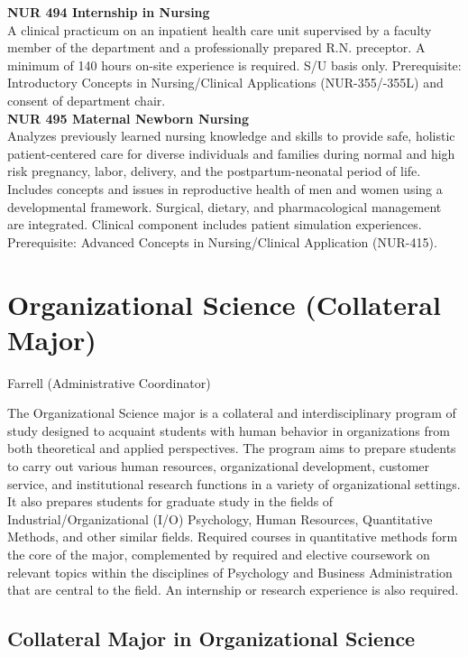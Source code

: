 \documentclass[
  letterpaper,
]{scrbook}
\begin{document}
\textbf{NUR 494 Internship in Nursing}\\
A clinical practicum on an inpatient health care unit supervised by a
faculty member of the department and a professionally prepared R.N.
preceptor. A minimum of 140 hours on-site experience is required. S/U
basis only. Prerequisite: Introductory Concepts in Nursing/Clinical
Applications (NUR-355/-355L) and consent of department chair.\\
\textbf{NUR 495 Maternal Newborn Nursing}\\
Analyzes previously learned nursing knowledge and skills to provide
safe, holistic patient-centered care for diverse individuals and
families during normal and high risk pregnancy, labor, delivery, and the
postpartum-neonatal period of life. Includes concepts and issues in
reproductive health of men and women using a developmental framework.
Surgical, dietary, and pharmacological management are integrated.
Clinical component includes patient simulation experiences.
Prerequisite: Advanced Concepts in Nursing/Clinical Application
(NUR-415).

\section{Organizational Science (Collateral
Major)}\label{sec-organizational-science}

Farrell (Administrative Coordinator)

The Organizational Science major is a collateral and interdisciplinary
program of study designed to acquaint students with human behavior in
organizations from both theoretical and applied perspectives. The
program aims to prepare students to carry out various human resources,
organizational development, customer service, and institutional research
functions in a variety of organizational settings. It also prepares
students for graduate study in the fields of Industrial/Organizational
(I/O) Psychology, Human Resources, Quantitative Methods, and other
similar fields. Required courses in quantitative methods form the core
of the major, complemented by required and elective coursework on
relevant topics within the disciplines of Psychology and Business
Administration that are central to the field. An internship or research
experience is also required.

\subsection{Collateral Major in Organizational
Science}\label{collateral-major-in-organizational-science}
\end{document}

